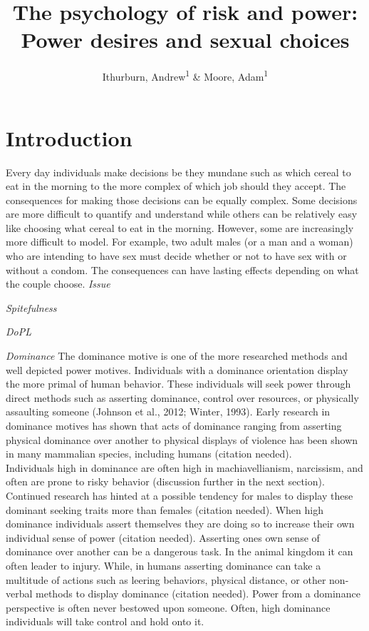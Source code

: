 \documentclass[
  english,
  a4paper]{apa7}
\title{The psychology of risk and power: Power desires and sexual choices}
\author{Ithurburn, Andrew\textsuperscript{1} \& Moore, Adam\textsuperscript{1}}
\date{}
\affiliation{\vspace{0.5cm}\textsuperscript{1} The University of Edinburgh}
\begin{document}
\maketitle

\hypertarget{introduction}{%
\section{Introduction}\label{introduction}}

Every day individuals make decisions be they mundane such as which cereal to eat in the morning to the more complex of which job should they accept. The consequences for making those decisions can be equally complex. Some decisions are more difficult to quantify and understand while others can be relatively easy like choosing what cereal to eat in the morning. However, some are increasingly more difficult to model. For example, two adult males (or a man and a woman) who are intending to have sex must decide whether or not to have sex with or without a condom. The consequences can have lasting effects depending on what the couple choose.
\emph{Issue}

\emph{Spitefulness}

\emph{DoPL}

\emph{Dominance}
The dominance motive is one of the more researched methods and well depicted power motives. Individuals with a dominance orientation display the more primal of human behavior. These individuals will seek power through direct methods such as asserting dominance, control over resources, or physically assaulting someone (Johnson et al., 2012; Winter, 1993). Early research in dominance motives has shown that acts of dominance ranging from asserting physical dominance over another to physical displays of violence has been shown in many mammalian species, including humans (citation needed).\\
Individuals high in dominance are often high in machiavellianism, narcissism, and often are prone to risky behavior (discussion further in the next section). Continued research has hinted at a possible tendency for males to display these dominant seeking traits more than females (citation needed). When high dominance individuals assert themselves they are doing so to increase their own individual sense of power (citation needed). Asserting ones own sense of dominance over another can be a dangerous task. In the animal kingdom it can often leader to injury. While, in humans asserting dominance can take a multitude of actions such as leering behaviors, physical distance, or other non-verbal methods to display dominance (citation needed). Power from a dominance perspective is often never bestowed upon someone. Often, high dominance individuals will take control and hold onto it.
\end{document}
